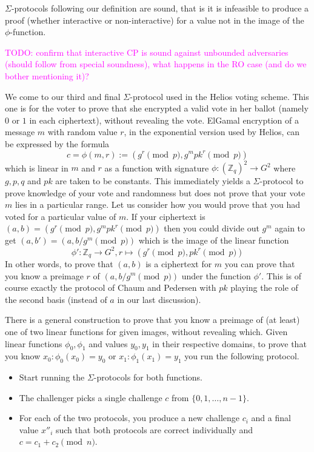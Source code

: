 \documentclass{llncs}
\begin{document}
\begin{proposition}
$\Sigma$-protocols following our definition are sound, that is it is infeasible
to produce a proof (whether interactive or non-interactive) for a value not in
the image of the $\phi$-function.
\end{proposition}

\textcolor{Fuchsia}{TODO: confirm that interactive CP is sound against unbounded
adversaries (should follow from special soundness), what happens in the RO case
(and do we bother mentioning it)?}

We come to our third and final $\Sigma$-protocol used in the Helios voting
scheme. This one is for the voter to prove that she encrypted a valid vote in
her ballot (namely $0$ or $1$ in each ciphertext), without revealing the vote.
ElGamal encryption of a message $m$ with random value $r$, in the exponential
version used by Helios, can be expressed by the formula
\[
c = \phi(m, r) := (g^r \pmod{p}, g^m pk^r \pmod{p})
\]
which is linear in $m$ and $r$ as a function with signature 
$\phi: (\mathbb Z_q)^2 \to G^2$ 
where $g, p, q$ and $pk$ are taken to be constants.
This immediately yields a $\Sigma$-protocol to prove knowledge of your vote and
randomness but does not prove that your vote $m$ lies in a particular range.
Let us consider how you would prove that you had voted for a particular value
of $m$. If your ciphertext is $(a, b) = (g^r \pmod{p}, g^m pk^r \pmod{p})$ then
you could divide out $g^m$ again to get $(a, b') = (a, b/g^m \pmod{p})$ which
is the image of the linear function
\[
\phi': \mathbb Z_q \to G^2, r \mapsto (g^r \pmod{p}, pk^r \pmod{p})
\]
In other words, to prove that $(a, b)$ is a ciphertext for $m$ you can prove
that you know a preimage $r$ of $(a, b/g^m \pmod{p})$ under the function
$\phi'$. This is of course exactly the protocol of Chaum and Pedersen with $pk$
playing the role of the second basis (instead of $a$ in our last discussion).

There is a general construction to prove that you know a preimage of (at least)
one of two linear functions for given images, without revealing which. Given
linear functions $\phi_0, \phi_1$ and values $y_0, y_1$ in their respective
domains, to prove that you know $x_0: \phi_0(x_0) = y_0$ or
$x_1: \phi_1(x_1) = y_1$ you run the following protocol.
\begin{itemize}
\item Start running the $\Sigma$-protocols for both functions.
\item The challenger picks a single challenge $c$ from $\{0, 1, \ldots, n-1\}$.
\item For each of the two protocols, you produce a new challenge $c_i$ and a
final value $x''_i$ such that both protocols are correct individually and $c =
c_1 + c_2 \pmod{n}$.
\end{itemize}
\end{document}
